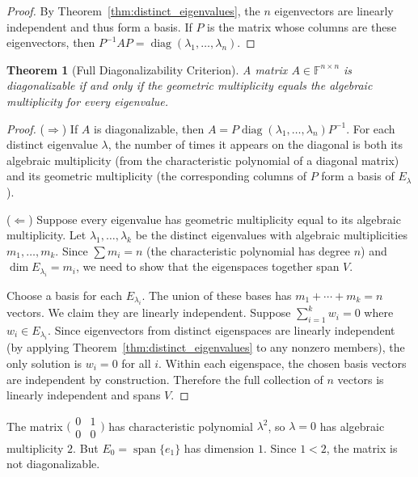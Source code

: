 \documentclass[11pt,a4paper]{article}
\theoremstyle{definition}
\theoremstyle{plain}
\newtheorem{theorem}{Theorem}[section]
\theoremstyle{remark}
\newcommand{\F}{\mathbb{F}}
\DeclareMathOperator{\diag}{diag}
\DeclareMathOperator{\Span}{span}
\begin{document}
\begin{proof}
By Theorem~\ref{thm:distinct_eigenvalues}, the $n$ eigenvectors are linearly independent and
thus form a basis. If $P$ is the matrix whose columns are these eigenvectors, then
$P^{-1}AP = \diag(\lambda_1, \ldots, \lambda_n)$.
\end{proof}

\begin{theorem}[Full Diagonalizability Criterion]
\label{thm:diag_criterion}
A matrix $A \in \F^{n \times n}$ is diagonalizable if and only if the geometric multiplicity
equals the algebraic multiplicity for every eigenvalue.
\end{theorem}

\begin{proof}
($\Rightarrow$) If $A$ is diagonalizable, then $A = P \diag(\lambda_1, \ldots, \lambda_n) P^{-1}$.
For each distinct eigenvalue $\lambda$, the number of times it appears on the diagonal
is both its algebraic multiplicity (from the characteristic polynomial of a diagonal matrix)
and its geometric multiplicity (the corresponding columns of $P$ form a basis of $E_\lambda$).

($\Leftarrow$) Suppose every eigenvalue has geometric multiplicity equal to its algebraic
multiplicity. Let $\lambda_1, \ldots, \lambda_k$ be the distinct eigenvalues with algebraic
multiplicities $m_1, \ldots, m_k$. Since $\sum m_i = n$ (the characteristic polynomial has
degree $n$) and $\dim E_{\lambda_i} = m_i$, we need to show that the eigenspaces together
span $V$.

Choose a basis for each $E_{\lambda_i}$. The union of these bases has $m_1 + \cdots + m_k = n$
vectors. We claim they are linearly independent. Suppose
$\sum_{i=1}^k w_i = 0$ where $w_i \in E_{\lambda_i}$. Since eigenvectors from distinct
eigenspaces are linearly independent (by applying Theorem~\ref{thm:distinct_eigenvalues}
to any nonzero members), the only solution is $w_i = 0$ for all $i$. Within each eigenspace,
the chosen basis vectors are independent by construction. Therefore the full collection of
$n$ vectors is linearly independent and spans $V$.
\end{proof}

\begin{warning}
The matrix $\bigl(\begin{smallmatrix} 0 & 1 \\ 0 & 0 \end{smallmatrix}\bigr)$ has
characteristic polynomial $\lambda^2$, so $\lambda = 0$ has algebraic multiplicity $2$.
But $E_0 = \Span\{e_1\}$ has dimension $1$. Since $1 < 2$, the matrix is not diagonalizable.
\end{warning}
\end{document}

